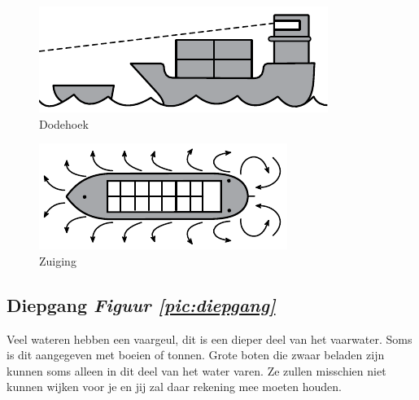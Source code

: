   \begin{center}
  \begin{minipage}[b]{0.35\textwidth}
    \begin{figure}[H]
        \includegraphics[width=\textwidth]{Hoofdstukken/Veiligheid/pdf/dode_hoek.pdf}
        \caption{Dodehoek}
        \label{pic:dodehoek}
    \end{figure}
  \end{minipage}
    \hspace{2cm}
  \begin{minipage}[b]{0.35\textwidth}
  \begin{figure}[H]
        \includegraphics[width=\textwidth]{Hoofdstukken/Veiligheid/pdf/zuiging.pdf}
        \caption{Zuiging}
        \label{pic:zuiging}
    \end{figure}
  \end{minipage}
  \end{center}

\newpage
\subsection{Diepgang  \hfill \textit{Figuur \ref{pic:diepgang}}}
Veel wateren hebben een vaargeul, dit is een dieper deel van het vaarwater. Soms is dit aangegeven met boeien of tonnen. Grote boten die zwaar beladen zijn kunnen soms alleen in dit deel van het water varen. Ze zullen misschien niet kunnen wijken voor je en jij zal daar rekening mee moeten houden.

